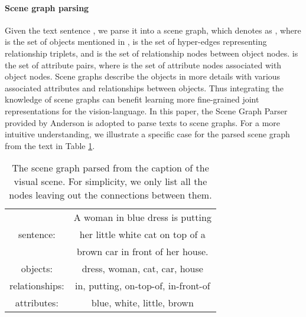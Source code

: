 \documentclass[letterpaper]{article} \usepackage{aaai21}  \usepackage{times}  \usepackage{helvet} \usepackage{courier}  \usepackage[hyphens]{url}  \usepackage{graphicx} \urlstyle{rm} \def\UrlFont{\rm}  \usepackage{natbib}  \usepackage{caption} \frenchspacing  \setlength{\pdfpagewidth}{8.5in}  \setlength{\pdfpageheight}{11in}  \usepackage{cite}
\begin{document}
\paragraph{Scene graph parsing}
Given the text sentence ,  we parse it into a scene graph\cite{johnson2015image}, which denotes as  , where  is the set of objects mentioned in ,  is the set of hyper-edges representing relationship triplets, and  is the set of relationship nodes between object nodes.  is the set of attribute pairs, where   is the set of attribute nodes associated with object nodes. Scene graphs describe the objects in more details with various associated attributes  and relationships between objects. Thus integrating the knowledge  of scene graphs can benefit learning  more fine-grained joint representations for the vision-language. In this paper, the Scene Graph Parser provided by Anderson \cite{anderson2016spice} is adopted to parse texts to scene graphs. For a more intuitive understanding, we illustrate a specific case for the parsed scene graph  from the text in  
Table \ref{tab_sg}.

\begin{table}
\begin{center}
\begin{tabular}{c|c}
\hline
\multicolumn{1}{c|}{\multirow{3}{*}{sentence: }} & A woman in blue dress is putting  \\ 
\multicolumn{1}{c|}{}  &  her little white cat on top of a \\
\multicolumn{1}{c|}{}  &  brown car in front of her house. \\ \hline

\multicolumn{1}{c|}{\multirow{1}{*}{objects:}} & dress, woman, cat, car, house \\ \hline

\multicolumn{1}{c|}{\multirow{1}{*}{relationships:}} & in, putting, on-top-of, in-front-of \\ \hline

\multicolumn{1}{c|}{\multirow{1}{*}{ attributes: }} & blue, white, little, brown  \\ \hline


\end{tabular}
\end{center}
\caption{The scene graph parsed from the caption of the visual scene. For simplicity, we only list all the nodes leaving out the connections between them. }

\label{tab_sg}
\end{table}
\end{document}
